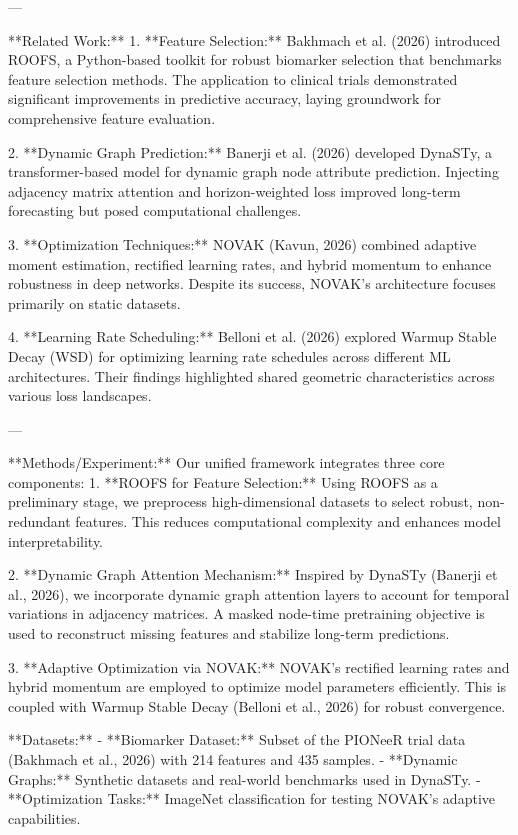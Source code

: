 ---

**Related Work:**  
1. **Feature Selection:**  
   Bakhmach et al. (2026) introduced ROOFS, a Python-based toolkit for robust biomarker selection that benchmarks feature selection methods. The application to clinical trials demonstrated significant improvements in predictive accuracy, laying groundwork for comprehensive feature evaluation.

2. **Dynamic Graph Prediction:**  
   Banerji et al. (2026) developed DynaSTy, a transformer-based model for dynamic graph node attribute prediction. Injecting adjacency matrix attention and horizon-weighted loss improved long-term forecasting but posed computational challenges.

3. **Optimization Techniques:**  
   NOVAK (Kavun, 2026) combined adaptive moment estimation, rectified learning rates, and hybrid momentum to enhance robustness in deep networks. Despite its success, NOVAK's architecture focuses primarily on static datasets.

4. **Learning Rate Scheduling:**  
   Belloni et al. (2026) explored Warmup Stable Decay (WSD) for optimizing learning rate schedules across different ML architectures. Their findings highlighted shared geometric characteristics across various loss landscapes.

---

**Methods/Experiment:**  
Our unified framework integrates three core components:  
1. **ROOFS for Feature Selection:**  
   Using ROOFS as a preliminary stage, we preprocess high-dimensional datasets to select robust, non-redundant features. This reduces computational complexity and enhances model interpretability.  

2. **Dynamic Graph Attention Mechanism:**  
   Inspired by DynaSTy (Banerji et al., 2026), we incorporate dynamic graph attention layers to account for temporal variations in adjacency matrices. A masked node-time pretraining objective is used to reconstruct missing features and stabilize long-term predictions.

3. **Adaptive Optimization via NOVAK:**  
   NOVAK's rectified learning rates and hybrid momentum are employed to optimize model parameters efficiently. This is coupled with Warmup Stable Decay (Belloni et al., 2026) for robust convergence.

**Datasets:**  
- **Biomarker Dataset:** Subset of the PIONeeR trial data (Bakhmach et al., 2026) with 214 features and 435 samples.  
- **Dynamic Graphs:** Synthetic datasets and real-world benchmarks used in DynaSTy.  
- **Optimization Tasks:** ImageNet classification for testing NOVAK's adaptive capabilities.

